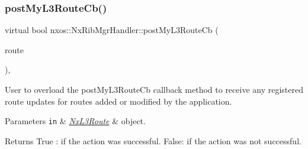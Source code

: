 \subsubsection{\texorpdfstring{post\+My\+L3\+Route\+Cb()}{postMyL3RouteCb()}}
{\footnotesize\ttfamily virtual bool nxos\+::\+Nx\+Rib\+Mgr\+Handler\+::post\+My\+L3\+Route\+Cb (\begin{DoxyParamCaption}\item[{\mbox{\hyperlink{classnxos_1_1_nx_l3_route}{Nx\+L3\+Route}} $\ast$}]{route }\end{DoxyParamCaption})\hspace{0.3cm}{\ttfamily [inline]}, {\ttfamily [virtual]}}

User to overload the post\+My\+L3\+Route\+Cb callback method to receive any registered route updates for routes added or modified by the application. 
\begin{DoxyParams}[1]{Parameters}
\mbox{\tt in}  & {\em \mbox{\hyperlink{classnxos_1_1_nx_l3_route}{Nx\+L3\+Route}}} & object.\\
\hline
\end{DoxyParams}
\begin{DoxyReturn}{Returns}
True \+: if the action was successful. False\+: if the action was not successful.
\end{DoxyReturn}

